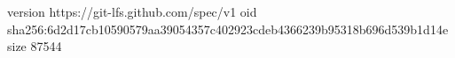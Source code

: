 version https://git-lfs.github.com/spec/v1
oid sha256:6d2d17cb10590579aa39054357c402923cdeb4366239b95318b696d539b1d14e
size 87544
